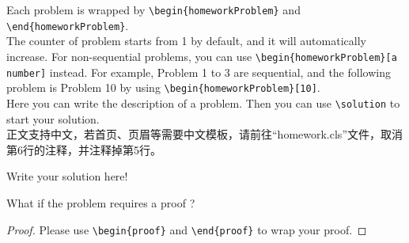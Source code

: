 \documentclass[UTF8]{homework}
\begin{document}
\maketitle
\pagebreak


%
%
\begin{homeworkProblem}
    Each problem is wrapped by \verb|\begin{homeworkProblem}| and \verb|\end{homeworkProblem}|.\\

    The counter of problem starts from 1 by default, and it will automatically increase.
    For non-sequential problems, you can use \verb|\begin{homeworkProblem}[a number]| instead.
    For example, Problem 1 to 3 are sequential, and the following problem is Problem 10 by using \verb|\begin{homeworkProblem}[10]|.\\
    
    Here you can write the description of a problem.
    Then you can use \verb|\solution| to start your solution.\\

    正文支持中文，若首页、页眉等需要中文模板，请前往“homework.cls”文件，取消第6行的注释，并注释掉第5行。
    
    \solution

    Write your solution here!

\end{homeworkProblem}


%
%
\begin{homeworkProblem}
    What if the problem requires a proof ? 

    \begin{proof}
        Please use \verb|\begin{proof}| and \verb|\end{proof}| to wrap your proof.
    \end{proof}

\end{homeworkProblem}
\end{document}
